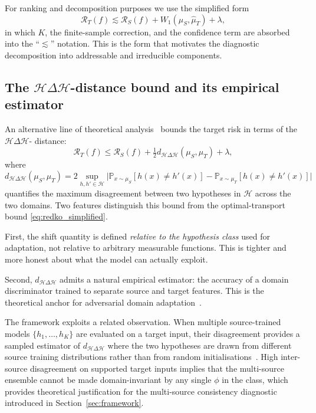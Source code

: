 \documentclass{article}
\begin{document}
For ranking and decomposition purposes we use the simplified form
\begin{equation}
\mathcal{R}_T(f) \lesssim \mathcal{R}_S(f) + W_1(\hat\mu_S, \hat\mu_T) + \lambda,
\label{eq:redko_simplified}
\end{equation}
in which $K$, the finite-sample correction, and the confidence term
are absorbed into the ``$\lesssim$'' notation. This is the form that
motivates the diagnostic decomposition into addressable and irreducible
components.

\subsection{The $\mathcal{H}\Delta\mathcal{H}$-distance bound and its
empirical estimator}
\label{sec:bendavid}

An alternative line of theoretical analysis~\citep{bendavid2010theory}
bounds the target risk in terms of the $\mathcal{H}\Delta\mathcal{H}$-%
distance:
\begin{equation}
\mathcal{R}_T(f) \le \mathcal{R}_S(f)
+ \tfrac{1}{2} d_{\mathcal{H}\Delta\mathcal{H}}(\mu_S, \mu_T) + \lambda,
\label{eq:bendavid}
\end{equation}
where
\begin{equation}
d_{\mathcal{H}\Delta\mathcal{H}}(\mu_S, \mu_T)
= 2 \sup_{h, h' \in \mathcal{H}} \Big|
\mathbb{P}_{x\sim\mu_S}[h(x) \neq h'(x)]
- \mathbb{P}_{x\sim\mu_T}[h(x) \neq h'(x)]
\Big|
\end{equation}
quantifies the maximum disagreement between two hypotheses in
$\mathcal{H}$ across the two domains. Two features distinguish this
bound from the optimal-transport bound \eqref{eq:redko_simplified}.

First, the shift quantity is defined \emph{relative to the hypothesis
class} used for adaptation, not relative to arbitrary measurable
functions. This is tighter and more honest about what the model can
actually exploit.

Second, $d_{\mathcal{H}\Delta\mathcal{H}}$ admits a natural empirical
estimator: the accuracy of a domain discriminator trained to separate
source and target features. This is the theoretical anchor for
adversarial domain adaptation~\citep{ganin2016domain}.

The framework exploits a related observation. When multiple
source-trained models $\{h_1, \ldots, h_K\}$ are evaluated on a target
input, their disagreement provides a sampled estimator of
$d_{\mathcal{H}\Delta\mathcal{H}}$ where the two hypotheses are drawn
from different source training distributions rather than from random
initialisations~\citep{mansour2008domain,lakshminarayanan2017simple}.
High inter-source disagreement on supported target inputs implies that
the multi-source ensemble cannot be made domain-invariant by any
single $\phi$ in the class, which provides theoretical justification
for the multi-source consistency diagnostic introduced in
Section~\ref{sec:framework}.
\end{document}
